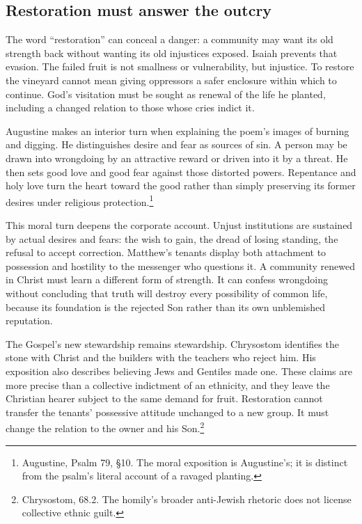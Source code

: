 \subsection{Restoration must answer the outcry}
The word ``restoration'' can conceal a danger: a community may want its old strength back without wanting its old injustices exposed. Isaiah prevents that evasion. The failed fruit is not smallness or vulnerability, but injustice. To restore the vineyard cannot mean giving oppressors a safer enclosure within which to continue. God's visitation must be sought as renewal of the life he planted, including a changed relation to those whose cries indict it.

Augustine makes an interior turn when explaining the poem's images of burning and digging. He distinguishes desire and fear as sources of sin. A person may be drawn into wrongdoing by an attractive reward or driven into it by a threat. He then sets good love and good fear against those distorted powers. Repentance and holy love turn the heart toward the good rather than simply preserving its former desires under religious protection.\footnote{Augustine, Psalm 79, §10. The moral exposition is Augustine's; it is distinct from the psalm's literal account of a ravaged planting.}

This moral turn deepens the corporate account. Unjust institutions are sustained by actual desires and fears: the wish to gain, the dread of losing standing, the refusal to accept correction. Matthew's tenants display both attachment to possession and hostility to the messenger who questions it. A community renewed in Christ must learn a different form of strength. It can confess wrongdoing without concluding that truth will destroy every possibility of common life, because its foundation is the rejected Son rather than its own unblemished reputation.

The Gospel's new stewardship remains stewardship. Chrysostom identifies the stone with Christ and the builders with the teachers who reject him. His exposition also describes believing Jews and Gentiles made one. These claims are more precise than a collective indictment of an ethnicity, and they leave the Christian hearer subject to the same demand for fruit. Restoration cannot transfer the tenants' possessive attitude unchanged to a new group. It must change the relation to the owner and his Son.\footnote{Chrysostom,  68.2. The homily's broader anti-Jewish rhetoric does not license collective ethnic guilt.}

